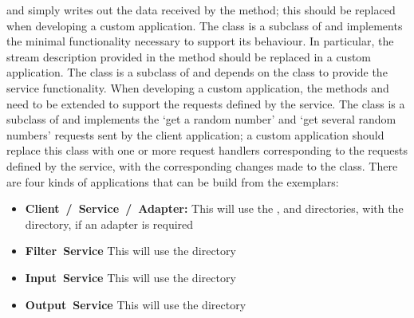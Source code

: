 and simply writes out the data received by the
 method; this should be replaced when developing a custom application.
The  class is a subclass of
 and implements the minimal functionality necessary
to support its behaviour.
In particular, the stream description provided in the method
 should be replaced in a custom application.
The  class is a subclass of
 and depends on the
 class to provide the service functionality.
When developing a custom application, the methods  and
 need to be extended to support the requests defined by the
service.
The  class is a subclass of
 and implements the `get a random number' and
`get several random numbers' requests sent by the 
client application; a custom application should replace this class with one or more
request handlers corresponding to the requests defined by the service, with the
corresponding changes made to the  class.
\secondaryEnd
{}
There are four kinds of applications that can be build from the exemplars:
\begin{itemize}
\item\textbf{Client~/~Service~/~Adapter:} This will use the
,  and
 directories, with the 
directory, if an adapter is required
\item\exSp\textbf{Filter~Service} This will use the 
directory
\item\exSp\textbf{Input~Service} This will use the 
directory
\item\exSp\textbf{Output~Service} This will use the 
directory 
\end{itemize}

